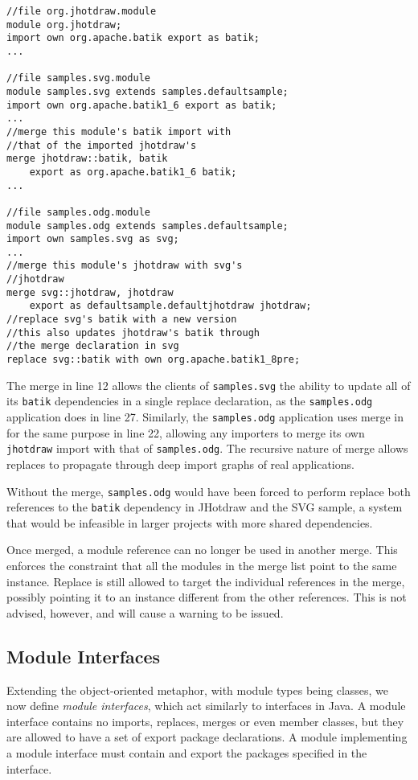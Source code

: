 \begin{lstlisting}[caption=Merge]
//file org.jhotdraw.module
module org.jhotdraw;
import own org.apache.batik export as batik;
...

//file samples.svg.module
module samples.svg extends samples.defaultsample;
import own org.apache.batik1_6 export as batik;
...
//merge this module's batik import with
//that of the imported jhotdraw's
merge jhotdraw::batik, batik 
	export as org.apache.batik1_6 batik;
...

//file samples.odg.module
module samples.odg extends samples.defaultsample;
import own samples.svg as svg;
...
//merge this module's jhotdraw with svg's
//jhotdraw
merge svg::jhotdraw, jhotdraw 
	export as defaultsample.defaultjhotdraw jhotdraw;
//replace svg's batik with a new version
//this also updates jhotdraw's batik through
//the merge declaration in svg
replace svg::batik with own org.apache.batik1_8pre;
\end{lstlisting}


The merge in line 12 allows the clients of \texttt{samples.svg}
the ability to update all of its \texttt{batik} dependencies
in a single replace declaration, as the \texttt{samples.odg}
application does in line 27. Similarly, the \texttt{samples.odg} application
uses merge in for the same purpose in line 22, allowing any importers
to merge its own \texttt{jhotdraw} import with that of \texttt{samples.odg}.
The recursive nature of merge allows replaces to propagate through deep
import graphs of real applications. 

Without the merge, \texttt{samples.odg}
would have been forced to perform replace both references to the \texttt{batik} dependency
in JHotdraw and the SVG sample, a system that would be infeasible in larger projects
with more shared dependencies.

Once merged, a module reference can no longer be used in another merge. This
enforces the constraint that all the modules in the merge list point to the
same instance. Replace is still allowed to target the individual 
references in the merge, possibly pointing it to an instance different from
the other references. This is not advised, however, and will cause a warning to be
issued.

\subsection{Module Interfaces}

Extending the object-oriented metaphor, with module types being classes, we 
now define \textit{module interfaces}, which act similarly to interfaces in Java. A module
interface contains no imports, replaces, merges or even member classes, but they
are allowed to have a set of export package declarations. A module implementing
a module interface must contain and export the packages specified in the interface.

